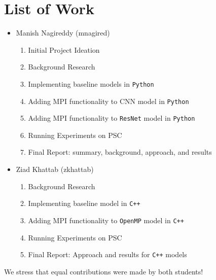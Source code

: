 \documentclass{article}
\begin{document}
\section{List of Work}

\begin{itemize}
  \item Manish Nagireddy (mnagired)
  \begin{enumerate}
    \item Initial Project Ideation
    \item Background Research
    \item Implementing baseline models in \texttt{Python}
    \item Adding MPI functionality to CNN model in \texttt{Python}
    \item Adding MPI functionality to \texttt{ResNet} model in \texttt{Python}
    \item Running Experiments on PSC
    \item Final Report: summary, background, approach, and results
  \end{enumerate}
  \item Ziad Khattab (zkhattab)
  \begin{enumerate}
    \item Background Research
    \item Implementing baseline model in \texttt{C++}
    \item Adding MPI functionality to \texttt{OpenMP} model in \texttt{C++}
    \item Running Experiments on PSC
    \item Final Report: Approach and results for \texttt{C++} models
  \end{enumerate}
\end{itemize}

We stress that equal contributions were made by both students!
\end{document}
